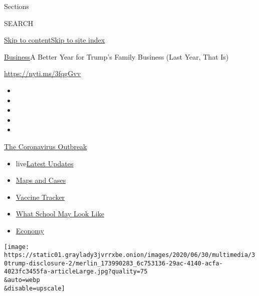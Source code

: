 Sections

SEARCH

\protect\hyperlink{site-content}{Skip to
content}\protect\hyperlink{site-index}{Skip to site index}

\href{/section/business}{Business}\textbar{}A Better Year for Trump's
Family Business (Last Year, That Is)

\url{https://nyti.ms/3fqgGvv}

\begin{itemize}
\item
\item
\item
\item
\item
\end{itemize}

\href{https://www.nytimes3xbfgragh.onion/news-event/coronavirus?action=click\&pgtype=Article\&state=default\&region=TOP_BANNER\&context=storylines_menu}{The
Coronavirus Outbreak}

\begin{itemize}
\tightlist
\item
  live\href{https://www.nytimes3xbfgragh.onion/2020/07/31/world/coronavirus-covid-19.html?action=click\&pgtype=Article\&state=default\&region=TOP_BANNER\&context=storylines_menu}{Latest
  Updates}
\item
  \href{https://www.nytimes3xbfgragh.onion/interactive/2020/us/coronavirus-us-cases.html?action=click\&pgtype=Article\&state=default\&region=TOP_BANNER\&context=storylines_menu}{Maps
  and Cases}
\item
  \href{https://www.nytimes3xbfgragh.onion/interactive/2020/science/coronavirus-vaccine-tracker.html?action=click\&pgtype=Article\&state=default\&region=TOP_BANNER\&context=storylines_menu}{Vaccine
  Tracker}
\item
  \href{https://www.nytimes3xbfgragh.onion/interactive/2020/07/29/us/schools-reopening-coronavirus.html?action=click\&pgtype=Article\&state=default\&region=TOP_BANNER\&context=storylines_menu}{What
  School May Look Like}
\item
  \href{https://www.nytimes3xbfgragh.onion/live/2020/07/31/business/stock-market-today-coronavirus?action=click\&pgtype=Article\&state=default\&region=TOP_BANNER\&context=storylines_menu}{Economy}
\end{itemize}

\texttt{[image: https://static01.graylady3jvrrxbe.onion/images/2020/06/30/multimedia/30trump-disclosure-2/merlin\_173990283\_6c753136-29ac-4140-acfa-4023fc3455fa-articleLarge.jpg?quality=75\\\&auto=webp\\\&disable=upscale]}

